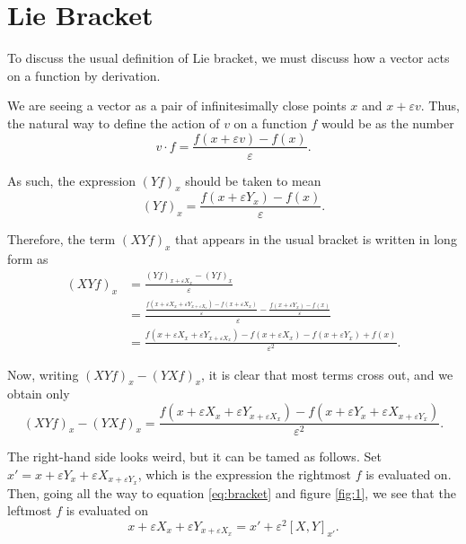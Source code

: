 \documentclass{article}
\theoremstyle{definition}
\begin{document}
\section{Lie Bracket}

To discuss the usual definition of Lie bracket, we must discuss how a vector acts on a function by derivation.

We are seeing a vector as a pair of infinitesimally close points $x$ and $x + \varepsilon v$. Thus, the natural way to define the action of $v$ on a function $f$ would be as the number
\begin{equation}
v \cdot f = \frac{f(x + \varepsilon v) - f(x)}\varepsilon.
\end{equation}

As such, the expression $(Yf)_x$ should be taken to mean
\begin{equation}
(Yf)_x = \frac{f(x + \varepsilon Y_x) - f(x)}\varepsilon.
\end{equation}

Therefore, the term $(XYf)_x$ that appears in the usual bracket is written in long form as
\begin{equation}
\begin{aligned}
(XYf)_x &= \frac{(Yf)_{x + \varepsilon X_x} - (Yf)_x}\varepsilon\\
&=\frac{\frac{f(x + \varepsilon X_x + \varepsilon Y_{x + \varepsilon X_x}) - f(x + \varepsilon X_x)}\varepsilon - \frac{f(x + \varepsilon Y_x) - f(x)}\varepsilon}\varepsilon\\
&=\frac{f(x + \varepsilon X_x + \varepsilon Y_{x + \varepsilon X_x}) - f(x + \varepsilon X_x) - f(x + \varepsilon Y_x) + f(x)}{\varepsilon^2}.
\end{aligned}
\end{equation}

Now, writing $(XYf)_x - (YX f)_x$, it is clear that most terms cross out, and we obtain only
\begin{equation}\label{eq:b2}
(XYf)_x - (YX f)_x =\frac{f(x + \varepsilon X_x + \varepsilon Y_{x + \varepsilon X_x}) - f(x + \varepsilon Y_x + \varepsilon X_{x + \varepsilon Y_x})}{\varepsilon^2}.
\end{equation}

The right-hand side looks weird, but it can be tamed as follows. Set $x' = x + \varepsilon Y_x + \varepsilon X_{x + \varepsilon Y_x}$, which is the expression the rightmost $f$ is evaluated on. Then, going all the way to equation \eqref{eq:bracket} and figure \ref{fig:1}, we see that the leftmost $f$ is evaluated on
\begin{equation}
x + \varepsilon X_x + \varepsilon Y_{x + \varepsilon X_x} = x' + \varepsilon^2 [X,Y]_{x'}.
\end{equation}
\end{document}
